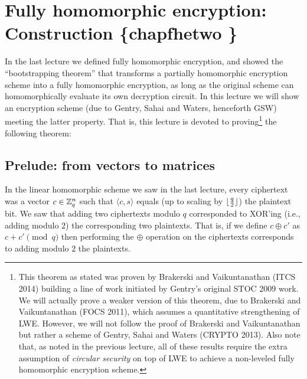 \chapter{Fully homomorphic encryption: Construction \{chapfhetwo
\}}\label{Fully-homomorphic-encryption-C}

In the last lecture we defined fully homomorphic encryption, and showed
the ``bootstrapping theorem'' that transforms a partially homomorphic
encryption scheme into a fully homomorphic encryption, as long as the
original scheme can homomorphically evaluate its own decryption circuit.
In this lecture we will show an encryption scheme (due to Gentry, Sahai
and Waters, henceforth GSW) meeting the latter property. That is, this
lecture is devoted to proving\footnote{This theorem as stated was proven
  by Brakerski and Vaikuntanathan (ITCS 2014) building a line of work
  initiated by Gentry's original STOC 2009 work. We will actually prove
  a weaker version of this theorem, due to Brakerski and Vaikuntanathan
  (FOCS 2011), which assumes a quantitative strengthening of LWE.
  However, we will not follow the proof of Brakerski and Vaikuntanathan
  but rather a scheme of Gentry, Sahai and Waters (CRYPTO 2013). Also
  note that, as noted in the previous lecture, all of these results
  require the extra assumption of \emph{circular security} on top of LWE
  to achieve a non-leveled fully homomorphic encryption scheme.} the
following theorem:

\hypertarget{LWEFHEthm}{}

\section{Prelude: from vectors to
matrices}\label{Prelude-from-vectors-to-matric}

In the linear homomorphic scheme we saw in the last lecture, every
ciphertext was a vector \(c\in{\mathbb{Z}}_q^n\) such that \(\langle c,s \rangle\)
equals (up to scaling by \(\lfloor \tfrac{q}{2} \rfloor\)) the plaintext bit. We
saw that adding two ciphertexts modulo \(q\) corresponded to XOR'ing
(i.e., adding modulo \(2\)) the corresponding two plaintexts. That is,
if we define \(c \oplus c'\) as \(c+c' \pmod{q}\) then performing the
\(\oplus\) operation on the ciphertexts corresponds to adding modulo
\(2\) the plaintexts.

